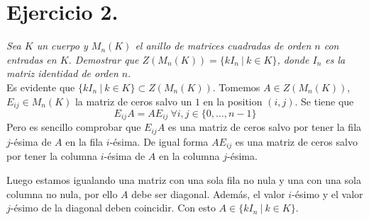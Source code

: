 \section{Ejercicio 2.} \emph{Sea \(K\) un cuerpo y \(M_n(K)\) el anillo de
  matrices cuadradas de orden \(n\) con entradas en \(K\). Demostrar que
  \(Z(M_n(K)) = \{kI_n \ | \  k \in K\}\), donde \(I_n\) es la matriz identidad
  de orden \(n\)}.\\

Es evidente que  \(\{kI_n \ | \  k \in K\} \subset Z(M_n(K))\). Tomemos \(A \in
Z(M_n(K))\), \(E_{ij} \in M_n(K)\) la matriz de ceros salvo un \(1\) en la
position \((i,j)\). Se tiene que
\[
E_{ij}A = AE_{ij} \ \forall i,j \in \{0,\dots,n-1\}
\]
Pero es sencillo comprobar que \(E_{ij}A\) es una matriz de ceros salvo por
tener la fila \(j\)-ésima de \(A\) en la fila \(i\)-ésima. De igual forma \(AE_{ij}\) es una matriz de ceros salvo por
tener la columna \(i\)-ésima de \(A\) en la columna \(j\)-ésima.

Luego estamos igualando una matriz con una sola fila no nula y una con una sola
columna no nula, por ello \(A\) debe ser diagonal. Además, el valor \(i\)-ésimo
y el valor \(j\)-ésimo de la diagonal deben coincidir. Con esto \(A \in \{kI_n
\ | \  k \in K\}\).
